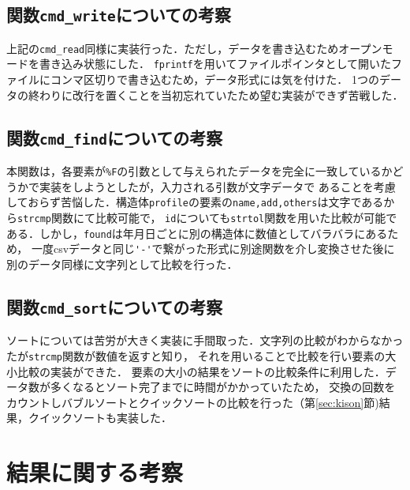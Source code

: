 \documentclass[a4j,11pt]{jarticle}
\begin{document}
\subsection{関数\texttt{cmd\_write}についての考察}
上記の\verb|cmd_read|同様に実装行った．ただし，データを書き込むためオープンモードを書き込み状態にした．
\verb|fprintf|を用いてファイルポインタとして開いたファイルにコンマ区切りで書き込むため，データ形式には気を付けた．
1つのデータの終わりに改行を置くことを当初忘れていたため望む実装ができず苦戦した．

\subsection{関数\texttt{cmd\_find}についての考察}
本関数は，各要素が\verb|%F|の引数として与えられたデータを完全に一致しているかどうかで実装をしようとしたが，入力される引数が文字データで
あることを考慮しておらず苦悩した．構造体\verb|profile|の要素の\verb|name,add,others|は文字であるから\verb|strcmp|関数にて比較可能で，
\verb|id|についても\verb|strtol|関数を用いた比較が可能である．しかし，\verb|found|は年月日ごとに別の構造体に数値としてバラバラにあるため，
一度csvデータと同じ\verb|'-'|で繋がった形式に別途関数を介し変換させた後に別のデータ同様に文字列として比較を行った．

\subsection{関数\texttt{cmd\_sort}についての考察}
ソートについては苦労が大きく実装に手間取った．文字列の比較がわからなかったが\verb|strcmp|関数が数値を返すと知り，
それを用いることで比較を行い要素の大小比較の実装ができた．
要素の大小の結果をソートの比較条件に利用した．データ数が多くなるとソート完了までに時間がかかっていたため，
交換の回数をカウントしバブルソートとクイックソートの比較を行った（第\ref{sec:kison}節)結果，クイックソートも実装した．

\section{結果に関する考察}
\end{document}
